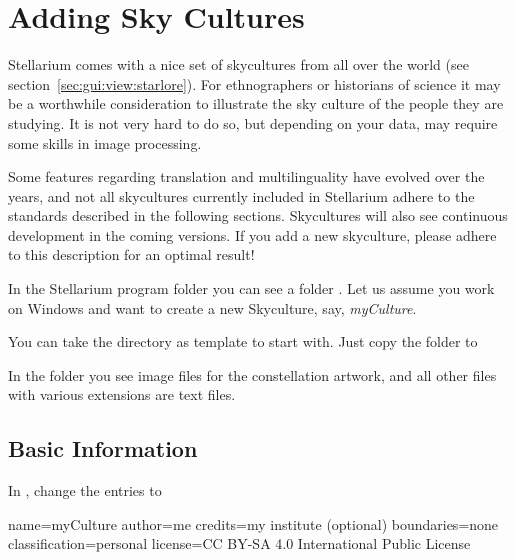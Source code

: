 

\chapter{Adding Sky Cultures}
\label{ch:SkyCultures}


\noindent Stellarium comes with a nice set of skycultures from all
over the world (see section~\ref{sec:gui:view:starlore}). For ethnographers or
historians of science it may be a worthwhile consideration to
illustrate the sky culture of the people they are studying. It is not
very hard to do so, but depending on your data, may require some
skills in image processing.

Some features regarding translation and multilinguality have evolved
over the years, and not all skycultures currently included in
Stellarium adhere to the standards described in the following
sections. Skycultures will also see continuous development in the
coming versions. If you add a new skyculture, please adhere to this
description for an optimal result!


In the Stellarium program folder you can see a folder
. Let us assume you work on Windows and want to create a
new Skyculture, say, \emph{myCulture}.

You can take the  directory as template to start with. Just copy the folder 
 to

In the folder you see image files for the constellation artwork, and all
other files with various extensions are text files. 


\section{Basic Information}
\label{sec:skycultures:info.ini}


In , change the entries to 
\begin{configfile}[\scriptsize]
[info]
name=myCulture
author=me
credits=my institute (optional)
boundaries=none
classification=personal
license=CC BY-SA 4.0 International Public License
\end{configfile}

